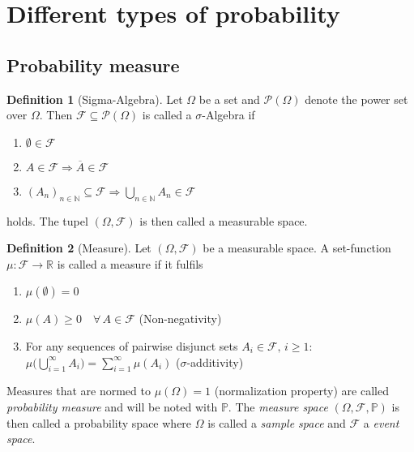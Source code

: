 \documentclass[
]{report}
\theoremstyle{definition}
\newtheorem{definition}{Definition}[section]
\begin{document}
\section{Different types of probability}

\subsection{Probability measure}

\begin{definition}[Sigma-Algebra]
Let $\Omega$ be a set and $\mathcal{P}(\Omega)$ denote the power set over $\Omega$. Then $\mathcal{F} \subseteq \mathcal{P}(\Omega)$ is called a $\sigma$-Algebra if 
\begin{enumerate}
  \item $\emptyset \in  \mathcal{F}$
  \item $A \in \mathcal{F} \Rightarrow \overline{A} \in \mathcal{F}$
  \item $(A_n)_{n \in \mathbb{N}} \subseteq \mathcal{F} \Rightarrow \displaystyle\bigcup_{n \in \mathbb{N}} A_n \in \mathcal{F}$
\end{enumerate}
holds. The tupel $(\Omega, \mathcal{F})$ is then called a {measurable space}.
\end{definition}
\begin{definition}[Measure]
Let $(\Omega, \mathcal{F})$ be a measurable space. A set-function $\mu : \mathcal{F} \rightarrow \mathbb{R}$ is called a {measure} if it fulfils
\begin{enumerate}
  \item $\mu(\emptyset) = 0$ 
  \item $\mu(A) \geq 0 \quad \forall \, A \in \mathcal{F}$ \quad (Non-negativity)
  \item For any sequences of pairwise disjunct sets $A_i \in \mathcal{F}, \, i \geq 1$: \newline
    $\mu \big(\bigcup_{i=1}^{\infty} A_i \big) = \sum_{i=1}^{\infty} \mu(A_i)$ \quad ($\sigma$-additivity)
\end{enumerate}
Measures that are normed to $\mu(\Omega) = 1$ (normalization property) are called \textit{probability measure} and will be noted with $\mathbb{P}$. The \textit{measure space} $(\Omega, \mathcal{F}, \mathbb{P})$ is then called a probability space where $\Omega$ is called a \textit{sample space} and $\mathcal{F}$ a \textit{event space}.
\end{definition}
\end{document}

